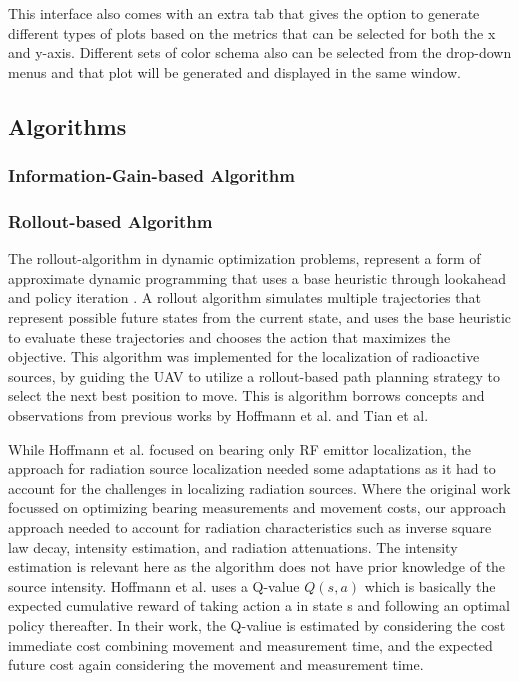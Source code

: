 \documentclass[../report.tex]{subfiles}
\begin{document}
    This interface also comes with an extra tab that gives the option to generate different types of plots based on the metrics that can be selected for both the x and y-axis. Different sets of color schema also can be 
    selected from the drop-down menus and that plot will be generated and displayed in the same window. 

    \subsection{Algorithms}
    \subsubsection{Information-Gain-based Algorithm}
    \subsubsection{Rollout-based Algorithm}

    The rollout-algorithm in dynamic optimization problems, represent a form of approximate dynamic programming that uses a base heuristic through lookahead and policy iteration \cite{bertsekas2013rollout}. 
    A rollout algorithm simulates multiple trajectories that represent possible future states from the current state, and uses the base heuristic to evaluate these trajectories and chooses the 
    action that maximizes the objective. This algorithm was implemented for the localization of radioactive sources, by guiding the UAV to utilize a rollout-based path planning strategy to select 
    the next best position to move. This is algorithm borrows concepts and observations from previous works by Hoffmann et al. \cite{rolloutHoffmann2019} and Tian et al. \cite{rolloutMultiStepLookaheadTian2008}

    While Hoffmann et al. focused on bearing only RF emittor localization, the approach for radiation source localization needed some adaptations as it had to account for the challenges in localizing 
    radiation sources. Where the original work focussed on optimizing bearing measurements and movement costs, our approach approach needed to account for radiation characteristics such as
    inverse square law decay, intensity estimation, and radiation attenuations. The intensity estimation is relevant here as the algorithm does not have prior knowledge of the source intensity. 
    Hoffmann et al. uses a Q-value $ Q(s,a) $ which is basically the expected cumulative reward of taking action a in state s and following an optimal policy thereafter. In their work, 
    the Q-valiue is estimated by considering the cost immediate cost combining movement and measurement time, and the expected future cost again considering the movement and measurement time.
    
\end{document}
